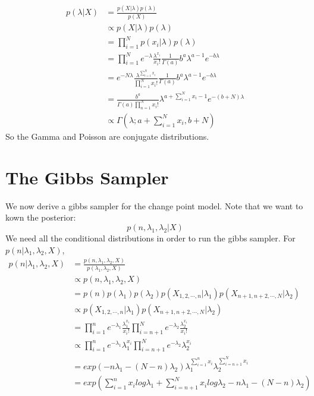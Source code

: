 \documentclass[12pt]{article}
\begin{document}
\begin{equation}
\begin{split}
p(\lambda|X) & = \frac{p(X|\lambda)p(\lambda)}{p(X)} \\
			 & \propto p(X|\lambda)p(\lambda) \\
			 & = \prod_{i=1}^N p(x_i|\lambda) p(\lambda) \\ 
			 & = \prod_{i=1}^N e^{-\lambda} \frac{\lambda^{x_i}}{x_i!} \frac{1}{\Gamma(a)}b^a\lambda^{a-1}e^{-b\lambda} \\
			 & = e^{-N\lambda}\frac{\lambda^{\sum_{i=1}^Nx_i}}{\prod_{i=1}^{N}x_i!}\frac{1}{\Gamma(a)}b^a\lambda^{a-1}e^{-b\lambda} \\
			 & = \frac{b^a}{\Gamma(a)\prod_{n=1}^Nx_i!}\lambda^{a+\sum_{i=1}^Nx_i-1}e^{-(b+N)\lambda} \\
			 & \propto \Gamma(\lambda;a+\sum_{i=1}^Nx_i,b+N)
\end{split}
\end{equation}
So the Gamma and Poisson are conjugate distributions.

\section{The Gibbs Sampler}
We now derive a gibbs sampler for the change point model. Note that we want to kown the posterior:
$$ p(n,\lambda_1,\lambda_2|X) $$
We need all the conditional distributions in order to run the gibbs sampler. For $p(n|\lambda_1,\lambda_2,X)$,
\begin{equation}\label{formula:npost} 
\begin{split}
p(n|\lambda_1,\lambda_2,X) & = \frac{p(n,\lambda_1,\lambda_2,X)}{p(\lambda_1,\lambda_2,X)} \\
						   & \propto p(n,\lambda_1,\lambda_2,X) \\
						   & = p(n) p(\lambda_1) p(\lambda_2) p(X_{1,2,\cdots,n}|\lambda_1) p(X_{n+1,n+2,\cdots,N}|\lambda_2) \\
						   & \propto p(X_{1,2,\cdots,n}|\lambda_1) p(X_{n+1,n+2,\cdots,N}|\lambda_2) \\ 
						   & = \prod_{i=1}^n e^{-\lambda_1}\frac{\lambda_1^{x_i}}{x_i!} \prod_{i=n+1}^N e^{-\lambda_2}\frac{\lambda_2^{x_i}}{x_i!} \\
						   & \propto \prod_{i=1}^n e^{-\lambda_1}\lambda_1^{x_i} \prod_{i=n+1}^N e^{-\lambda_2} \lambda_2^{x_i} \\
						   & = exp(-n\lambda_1 - (N-n)\lambda_2)\lambda_1^{\sum_{i=1}^nx_i}\lambda_2^{\sum_{i=n+1}^Nx_i} \\
						   & = exp(\sum_{i=1}^nx_ilog\lambda_1 + \sum_{i=n+1}^Nx_ilog\lambda_2 - n\lambda_1 - (N-n)\lambda_2) 
\end{split}
\end{equation}
\end{document}
